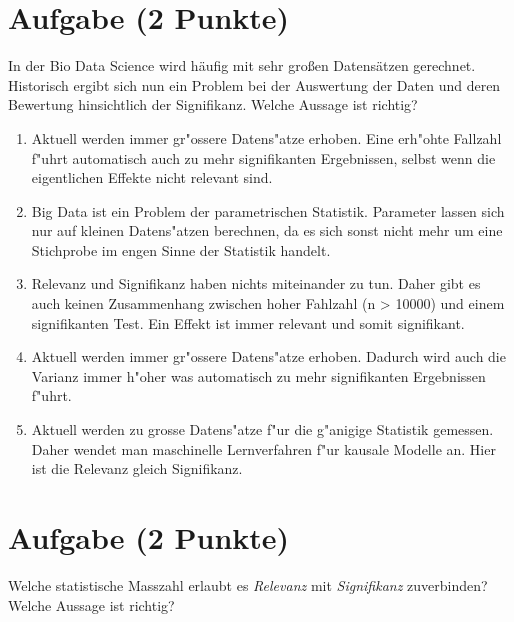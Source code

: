 \documentclass[a4paper, 10pt]{scrartcl}\usepackage[]{graphicx}\usepackage[]{color}
\begin{document}
\section{Aufgabe \hfill (2 Punkte)}

In der Bio Data Science wird h{\"a}ufig mit sehr gro{\ss}en Datens{\"a}tzen
gerechnet. Historisch ergibt sich nun ein Problem bei der Auswertung der
Daten und deren Bewertung hinsichtlich der Signifikanz. Welche Aussage ist richtig?



\begin{enumerate}
\item [\textbf{A} \msquare] Aktuell werden immer gr{"o}ssere Datens{"a}tze erhoben. Eine erh{"o}hte Fallzahl f{"u}hrt automatisch auch zu mehr signifikanten Ergebnissen, selbst wenn die eigentlichen Effekte nicht relevant sind.
\item [\textbf{B} \msquare] Big Data ist ein Problem der parametrischen Statistik. Parameter lassen sich nur auf kleinen Datens{"a}tzen berechnen, da es sich sonst nicht mehr um eine Stichprobe im engen Sinne der Statistik handelt.
\item [\textbf{C} \msquare] Relevanz und Signifikanz haben nichts miteinander zu tun. Daher gibt es auch keinen Zusammenhang zwischen hoher Fahlzahl (n > 10000) und einem signifikanten Test. Ein Effekt ist immer relevant und somit signifikant.
\item [\textbf{D} \msquare] Aktuell werden immer gr{"o}ssere Datens{"a}tze erhoben. Dadurch wird auch die Varianz immer h{"o}her was automatisch zu mehr signifikanten Ergebnissen f{"u}hrt.
\item [\textbf{E} \msquare] Aktuell werden zu grosse Datens{"a}tze f{"u}r die g{"a}nigige Statistik gemessen. Daher wendet man maschinelle Lernverfahren f{"u}r kausale Modelle an. Hier ist die Relevanz gleich Signifikanz.
\end{enumerate}

\section{Aufgabe \hfill (2 Punkte)}

Welche statistische Masszahl erlaubt es \textit{Relevanz} mit
\textit{Signifikanz} zuverbinden? Welche Aussage ist richtig?
\end{document}
